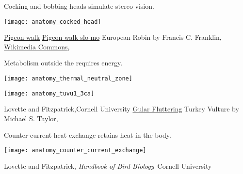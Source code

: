 \documentclass[t]{beamer}
\begin{document}
\begin{frame}[t,plain]{Cocking and bobbing heads simulate stereo vision.}

	\vspace{-0.5\baselineskip}
	
	\centering
	\texttt{[image: anatomy\_cocked\_head]}
		
	\vfilll
	
	\tiny \href{https://www.youtube.com/watch?v=bG139rclp_E}{Pigeon walk} \hfill \href{https://www.youtube.com/watch?v=9WV5DfDeCZI}{Pigeon walk slo-mo} \hfill European Robin by Francis C. Franklin, \href{https://en.wikipedia.org/wiki/File:Erithacus_rubecula_with_cocked_head.jpg}{Wikimedia Commons}, 
\end{frame}

\begin{frame}[t,plain]{Metabolism outside the  requires energy.}

	\vspace{-\baselineskip}
	
	\begin{multicols}{2}
	
	\centering
	\texttt{[image: anatomy\_thermal\_neutral\_zone]} 
	
	\columnbreak
	
	\texttt{[image: anatomy\_tuvu1\_3ca]}
	
	\end{multicols}

	\vfilll
	
	\tiny Lovette and Fitzpatrick,Cornell University \hfill \href{https://www.youtube.com/watch?v=NggVoJ7mOos}{Gular Fluttering} \hfill Turkey Vulture by Michael S. Taylor, 

\end{frame}

\begin{frame}[t,plain]{Counter-current heat exchange retains heat in the body.}
	
	\centering
	\texttt{[image: anatomy\_counter\_current\_exchange]} 

	\vfilll
	
	\tiny \hfill Lovette and Fitzpatrick, \textit{Handbook of Bird Biology} \textcopyright\,Cornell University

\end{frame}
\end{document}
